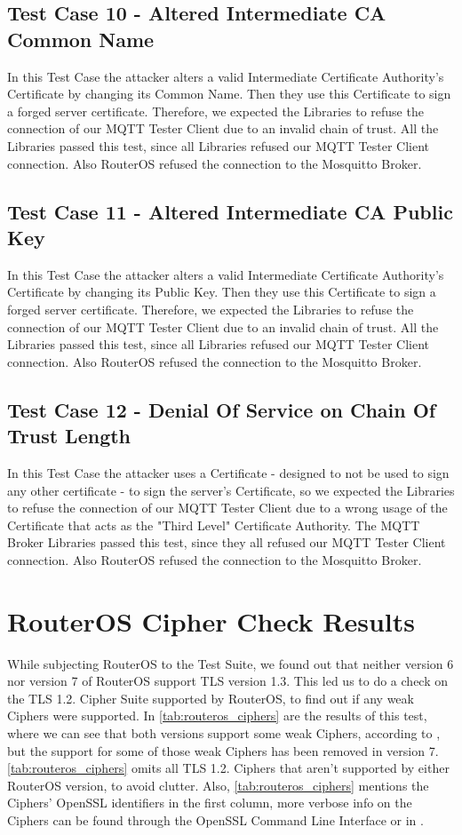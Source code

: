 \documentclass[binding=0.6cm,noexaminfo]{sapthesis}
\begin{document}
\subsection{Test Case 10 - Altered Intermediate CA Common Name}
In this Test Case the attacker alters a valid Intermediate Certificate Authority's Certificate by changing its Common Name. Then they use this Certificate to sign a forged server certificate. Therefore, we expected the Libraries to refuse the connection of our MQTT Tester Client due to an invalid chain of trust. All the Libraries passed this test, since all Libraries refused our MQTT Tester Client connection.
Also RouterOS refused the connection to the Mosquitto Broker.

\subsection{Test Case 11 - Altered Intermediate CA Public Key}
In this Test Case the attacker alters a valid Intermediate Certificate Authority's Certificate by changing its Public Key. Then they use this Certificate to sign a forged server certificate. Therefore, we expected the Libraries to refuse the connection of our MQTT Tester Client due to an invalid chain of trust. All the Libraries passed this test, since all Libraries refused our MQTT Tester Client connection.
Also RouterOS refused the connection to the Mosquitto Broker.

\subsection{Test Case 12 - Denial Of Service on Chain Of Trust Length}
In this Test Case the attacker uses a Certificate - designed to not be used to sign any other certificate - to sign the server's Certificate, so we expected the Libraries to refuse the connection of our MQTT Tester Client due to a wrong usage of the Certificate that acts as the "Third Level" Certificate Authority. The MQTT Broker Libraries passed this test, since they all refused our MQTT Tester Client connection.
Also RouterOS refused the connection to the Mosquitto Broker.

\section{RouterOS Cipher Check Results}\label{sec:routeros_ciphers}
While subjecting RouterOS to the Test Suite, we found out that neither version 6 nor version 7 of RouterOS support TLS version 1.3. This led us to do a check on the TLS 1.2. Cipher Suite supported by RouterOS, to find out if any weak Ciphers were supported. In \autoref{tab:routeros_ciphers} are the results of this test, where we can see that both versions support some weak Ciphers, according to \cite{ciphersuiteinfo}, but the support for some of those weak Ciphers has been removed in version 7. \autoref{tab:routeros_ciphers} omits all TLS 1.2. Ciphers that aren't supported by either RouterOS version, to avoid clutter. Also, \autoref{tab:routeros_ciphers} mentions the Ciphers' OpenSSL identifiers in the first column, more verbose info on the Ciphers can be found through the OpenSSL Command Line Interface or in \cite{ciphersuiteinfo}.
\end{document}
